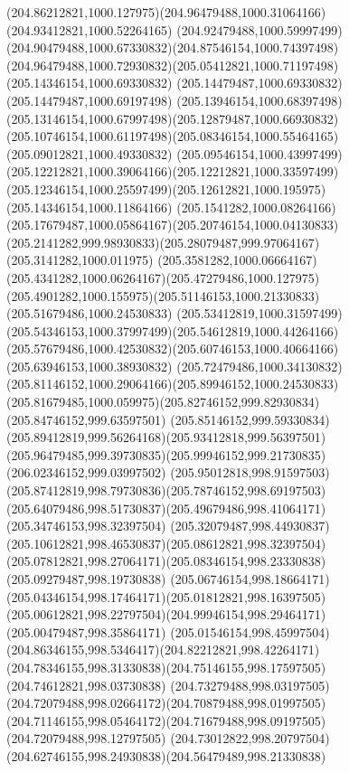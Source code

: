 {{	\curveto(204.86212821,1000.127975)(204.96479488,1000.31064166)(204.93412821,1000.52264165)
	\curveto(204.92479488,1000.59997499)(204.90479488,1000.67330832)(204.87546154,1000.74397498)
	\curveto(204.96479488,1000.72930832)(205.05412821,1000.71197498)(205.14346154,1000.69330832)
	\lineto(205.14479487,1000.69330832)
	\lineto(205.14479487,1000.69197498)
	\curveto(205.13946154,1000.68397498)(205.13146154,1000.67997498)(205.12879487,1000.66930832)
	\curveto(205.10746154,1000.61197498)(205.08346154,1000.55464165)(205.09012821,1000.49330832)
	\curveto(205.09546154,1000.43997499)(205.12212821,1000.39064166)(205.12212821,1000.33597499)
	\curveto(205.12346154,1000.25597499)(205.12612821,1000.195975)(205.14346154,1000.11864166)
	\curveto(205.1541282,1000.08264166)(205.17679487,1000.05864167)(205.20746154,1000.04130833)
	\curveto(205.2141282,999.98930833)(205.28079487,999.97064167)(205.3141282,1000.011975)
	\curveto(205.3581282,1000.06664167)(205.4341282,1000.06264167)(205.47279486,1000.127975)
	\curveto(205.4901282,1000.155975)(205.51146153,1000.21330833)(205.51679486,1000.24530833)
	\curveto(205.53412819,1000.31597499)(205.54346153,1000.37997499)(205.54612819,1000.44264166)
	\curveto(205.57679486,1000.42530832)(205.60746153,1000.40664166)(205.63946153,1000.38930832)
	\curveto(205.72479486,1000.34130832)(205.81146152,1000.29064166)(205.89946152,1000.24530833)
	\curveto(205.81679485,1000.059975)(205.82746152,999.82930834)(205.84746152,999.63597501)
	\curveto(205.85146152,999.59330834)(205.89412819,999.56264168)(205.93412818,999.56397501)
	\curveto(205.96479485,999.39730835)(205.99946152,999.21730835)(206.02346152,999.03997502)
	\curveto(205.95012818,998.91597503)(205.87412819,998.79730836)(205.78746152,998.69197503)
	\curveto(205.64079486,998.51730837)(205.49679486,998.41064171)(205.34746153,998.32397504)
	\curveto(205.32079487,998.44930837)(205.10612821,998.46530837)(205.08612821,998.32397504)
	\curveto(205.07812821,998.27064171)(205.08346154,998.23330838)(205.09279487,998.19730838)
	\curveto(205.06746154,998.18664171)(205.04346154,998.17464171)(205.01812821,998.16397505)
	\curveto(205.00612821,998.22797504)(204.99946154,998.29464171)(205.00479487,998.35864171)
	\curveto(205.01546154,998.45997504)(204.86346155,998.5346417)(204.82212821,998.42264171)
	\curveto(204.78346155,998.31330838)(204.75146155,998.17597505)(204.74612821,998.03730838)
	\curveto(204.73279488,998.03197505)(204.72079488,998.02664172)(204.70879488,998.01997505)
	\curveto(204.71146155,998.05464172)(204.71679488,998.09197505)(204.72079488,998.12797505)
	\curveto(204.73012822,998.20797504)(204.62746155,998.24930838)(204.56479489,998.21330838)
}}

